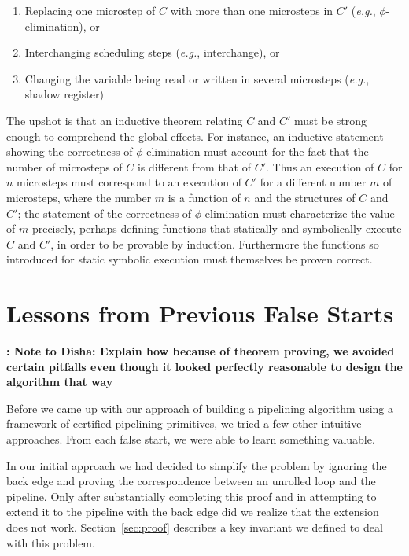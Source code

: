 \begin{enumerate}
\item Replacing one microstep of $C$ with more than one
  microsteps in $C'$ ({\em e.g.}, $\phi$-elimination), or
\item Interchanging scheduling steps ({\em e.g.},
  interchange), or
\item Changing the variable being read or written in several
  microsteps ({\em e.g.}, shadow register)
\end{enumerate}
The upshot is that an inductive theorem relating $C$ and
$C'$ must be strong enough to comprehend the global effects.
For instance, an inductive statement showing the
correctness of $\phi$-elimination must account for the fact
that the number of microsteps of $C$ is different from that
of $C'$.  Thus an execution of $C$ for $n$ microsteps must
correspond to an execution of $C'$ for a different number
$m$ of microsteps, where the number $m$ is a function of $n$
and the structures of $C$ and $C'$; the statement of the
correctness of $\phi$-elimination must characterize the
value of $m$ precisely, perhaps defining functions that
statically and symbolically execute $C$ and $C'$, in order
to be provable by induction.  Furthermore the functions so
introduced for static symbolic execution must themselves be
proven correct.

\section{Lessons from Previous False Starts}

{\bf: Note to Disha: Explain how because of theorem proving, we avoided certain pitfalls even though
it looked perfectly reasonable to design the algorithm that way}

Before we came up with our approach of building a pipelining
algorithm using a framework of certified pipelining primitives,
we tried a few other intuitive approaches.
From each false start, we were able to learn something valuable.

In our initial approach we had decided to simplify the problem
by ignoring the back edge and proving the correspondence
between an unrolled loop and the pipeline.
Only after substantially completing this proof and in
attempting to extend it to the pipeline with the back edge
did we realize that the extension does not work. Section~\ref{sec:proof} describes a key
invariant we defined to deal with this problem.

